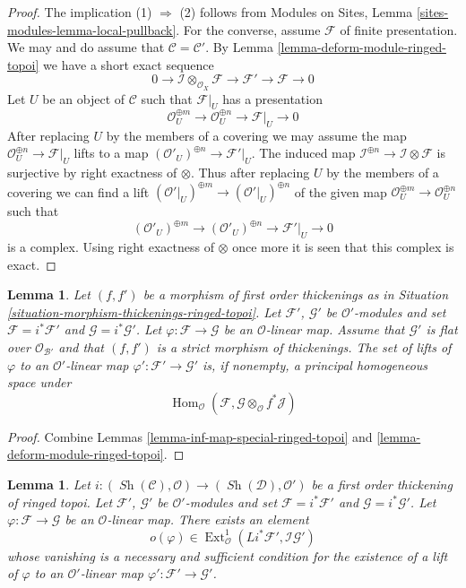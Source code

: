 \documentclass{stacks-project}
\theoremstyle{plain}
\newtheorem{lemma}[subsection]{Lemma}
\theoremstyle{definition}
\theoremstyle{remark}
\numberwithin{equation}{subsection}
\def\Hom{\mathop{\mathrm{Hom}}\nolimits}
\def\Ext{\mathop{\mathrm{Ext}}\nolimits}
\def\Sh{\mathop{\mathit{Sh}}\nolimits}
\begin{document}
\begin{proof}
The implication (1) $\Rightarrow$ (2) follows from
Modules on Sites, Lemma \ref{sites-modules-lemma-local-pullback}.
For the converse, assume $\mathcal{F}$ of finite presentation.
We may and do assume that $\mathcal{C} = \mathcal{C}'$.
By Lemma \ref{lemma-deform-module-ringed-topoi} we have a short exact sequence
$$
0 \to \mathcal{I} \otimes_{\mathcal{O}_X} \mathcal{F} \to
\mathcal{F}' \to \mathcal{F} \to 0
$$
Let $U$ be an object of $\mathcal{C}$ such that $\mathcal{F}|_U$ has a
presentation
$$
\mathcal{O}_U^{\oplus m} \to \mathcal{O}_U^{\oplus n} \to \mathcal{F}|_U \to 0
$$
After replacing $U$ by the members of a covering we may assume the
map $\mathcal{O}_U^{\oplus n} \to \mathcal{F}|_U$ lifts to a map
$(\mathcal{O}'_U)^{\oplus n} \to \mathcal{F}'|_U$. The induced map
$\mathcal{I}^{\oplus n} \to \mathcal{I} \otimes \mathcal{F}$ is
surjective by right exactness of $\otimes$. Thus after replacing $U$
by the members of a covering we can find a lift
$(\mathcal{O}'|_U)^{\oplus m} \to (\mathcal{O}'|_U)^{\oplus n}$
of the given map $\mathcal{O}_U^{\oplus m} \to \mathcal{O}_U^{\oplus n}$
such that
$$
(\mathcal{O}'_U)^{\oplus m} \to (\mathcal{O}'_U)^{\oplus n} \to
\mathcal{F}'|_U \to 0
$$
is a complex. Using right exactness of $\otimes$ once more it is seen
that this complex is exact.
\end{proof}

\begin{lemma}
\label{lemma-inf-map-rel-ringed-topoi}
Let $(f, f')$ be a morphism of first order thickenings as in
Situation \ref{situation-morphism-thickenings-ringed-topoi}.
Let $\mathcal{F}'$, $\mathcal{G}'$ be $\mathcal{O}'$-modules and set
$\mathcal{F} = i^*\mathcal{F}'$ and $\mathcal{G} = i^*\mathcal{G}'$.
Let $\varphi : \mathcal{F} \to \mathcal{G}$ be an $\mathcal{O}$-linear map.
Assume that $\mathcal{G}'$ is flat over $\mathcal{O}_{\mathcal{B}'}$ and that
$(f, f')$ is a strict morphism of thickenings.
The set of lifts of $\varphi$ to an $\mathcal{O}'$-linear map
$\varphi' : \mathcal{F}' \to \mathcal{G}'$ is, if nonempty, a principal
homogeneous space under
$$
\Hom_\mathcal{O}(\mathcal{F},
\mathcal{G} \otimes_\mathcal{O} f^*\mathcal{J})
$$
\end{lemma}

\begin{proof}
Combine Lemmas \ref{lemma-inf-map-special-ringed-topoi} and
\ref{lemma-deform-module-ringed-topoi}.
\end{proof}

\begin{lemma}
\label{lemma-inf-obs-map-special-ringed-topoi}
Let $i : (\Sh(\mathcal{C}), \mathcal{O}) \to (\Sh(\mathcal{D}), \mathcal{O}')$
be a first order thickening of ringed topoi.
Let $\mathcal{F}'$, $\mathcal{G}'$ be $\mathcal{O}'$-modules and set
$\mathcal{F} = i^*\mathcal{F}'$ and $\mathcal{G} = i^*\mathcal{G}'$.
Let $\varphi : \mathcal{F} \to \mathcal{G}$ be an $\mathcal{O}$-linear map.
There exists an element
$$
o(\varphi) \in
\Ext^1_\mathcal{O}(Li^*\mathcal{F}', \mathcal{I}\mathcal{G}')
$$
whose vanishing is a necessary and sufficient condition for the
existence of a lift of $\varphi$ to an $\mathcal{O}'$-linear map
$\varphi' : \mathcal{F}' \to \mathcal{G}'$.
\end{lemma}
\end{document}
